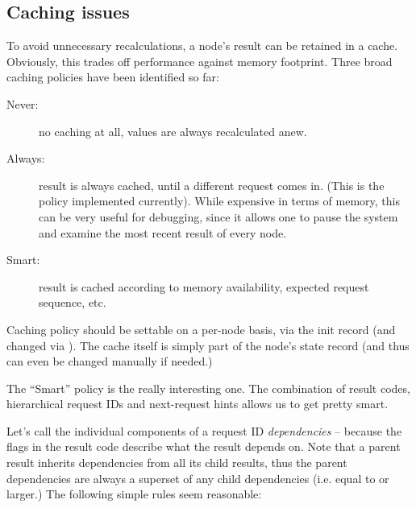 \documentclass[10pt]{article}
\begin{document}
\subsection{Caching issues}

  To avoid unnecessary recalculations, a node's result can be retained in a
  cache. Obviously, this trades off performance against memory footprint. Three
  broad caching policies have been identified so far:

  \begin{description}
  
  \item[Never:] no caching at all, values are always recalculated anew. 
   
  \item[Always:] result is always cached, until a different request comes in.
    (This is the policy implemented currently). While expensive in terms of
    memory, this can be very useful for debugging, since it allows one to pause
    the system and examine the most recent result of every node.

  \item[Smart:] result is cached according to memory availability, expected
    request sequence, etc.

  \end{description}
  
  Caching policy should be settable on a per-node basis, via the init record
  (and changed via ). The cache itself is simply part of the
  node's state record (and thus can even be changed manually if needed.)
  
  The ``Smart'' policy is the really interesting one. The combination of result
  codes, hierarchical request IDs and next-request hints allows us to get
  pretty smart. 
  
  Let's call the individual components of a request ID {\em dependencies} --
  because the  flags in the result code describe what the result
  depends on. Note that a parent result inherits dependencies from all its
  child results, thus the parent dependencies are always a superset of any
  child dependencies (i.e. equal to or larger.) The following simple rules seem
  reasonable:
\end{document}
